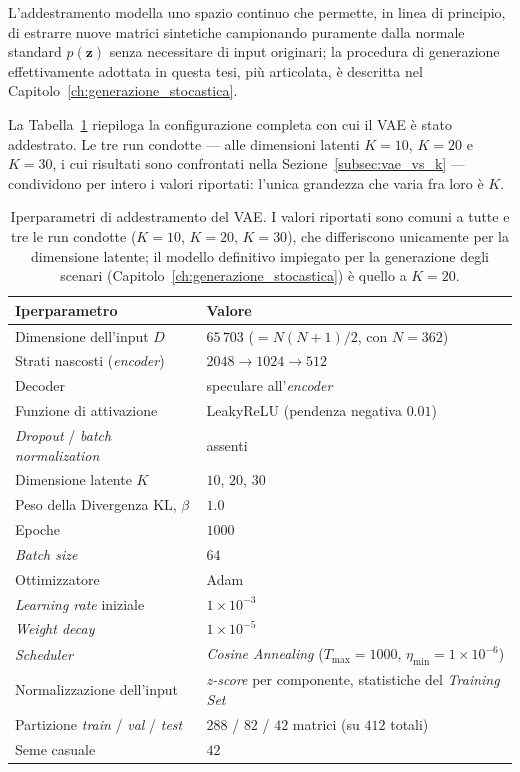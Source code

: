 L'addestramento modella uno spazio continuo che permette, in linea di principio, di estrarre nuove matrici sintetiche campionando puramente dalla normale standard $p(\mathbf{z})$ senza necessitare di input originari; la procedura di generazione effettivamente adottata in questa tesi, più articolata, è descritta nel Capitolo~\ref{ch:generazione_stocastica}.

La Tabella~\ref{tab:vae_iperparametri} riepiloga la configurazione completa con cui il VAE è stato addestrato. Le tre run condotte --- alle dimensioni latenti $K=10$, $K=20$ e $K=30$, i cui risultati sono confrontati nella Sezione~\ref{subsec:vae_vs_k} --- condividono per intero i valori riportati: l'unica grandezza che varia fra loro è $K$.

\begin{table}[htbp]
\centering
\small
\begin{tabular}{ll}
\hline
\textbf{Iperparametro} & \textbf{Valore} \\
\hline
Dimensione dell'input $D$ & $65\,703$ ($=N(N+1)/2$, con $N=362$) \\
Strati nascosti (\emph{encoder}) & $2048 \to 1024 \to 512$ \\
Decoder & speculare all'\emph{encoder} \\
Funzione di attivazione & LeakyReLU (pendenza negativa $0.01$) \\
\emph{Dropout} / \emph{batch normalization} & assenti \\
Dimensione latente $K$ & $10$, $20$, $30$ \\
Peso della Divergenza KL, $\beta$ & $1.0$ \\
Epoche & $1000$ \\
\emph{Batch size} & $64$ \\
Ottimizzatore & Adam \\
\emph{Learning rate} iniziale & $1\times10^{-3}$ \\
\emph{Weight decay} & $1\times10^{-5}$ \\
\emph{Scheduler} & \emph{Cosine Annealing} ($T_{\max}=1000$, $\eta_{\min}=1\times10^{-6}$) \\
Normalizzazione dell'input & \emph{z-score} per componente, statistiche del \emph{Training Set} \\
Partizione \emph{train} / \emph{val} / \emph{test} & $288$ / $82$ / $42$ matrici (su $412$ totali) \\
Seme casuale & $42$ \\
\hline
\end{tabular}
\caption{Iperparametri di addestramento del VAE. I valori riportati sono comuni a tutte e tre le run condotte ($K=10$, $K=20$, $K=30$), che differiscono unicamente per la dimensione latente; il modello definitivo impiegato per la generazione degli scenari (Capitolo~\ref{ch:generazione_stocastica}) è quello a $K=20$.}
\label{tab:vae_iperparametri}
\end{table}

